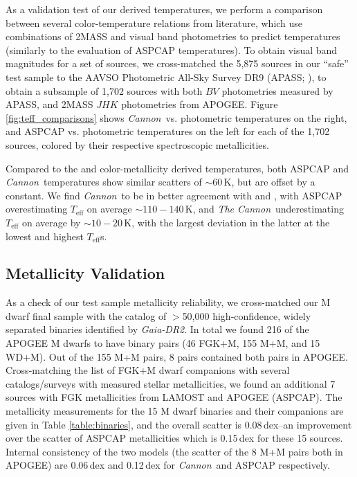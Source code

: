 \documentclass[twocolumn]{aastex62}
\newcommand{\thecannon}{\textsl{The Cannon}}
\newcommand{\cannon}{\textsl{Cannon}}
\newcommand{\drtwo}{\textsl{Gaia-DR2}}
\newcommand{\teff}{T_{\mathrm{eff}}}
\begin{document}
As a validation test of our derived temperatures, we perform a comparison between several color-temperature relations from literature, which use combinations of 2MASS and visual band photometries to predict temperatures (similarly to the \citealt{Schmidt:2016} evaluation of ASPCAP temperatures). To obtain visual band magnitudes for a set of sources, we cross-matched the 5,875 sources in our ``safe'' test sample to the AAVSO Photometric All-Sky Survey DR9 (APASS; \citealt{Henden:2016}), to obtain a subsample of 1,702 sources with both $BV$ photometries measured by APASS, and 2MASS $JHK$ photometries from APOGEE. Figure \ref{fig:teff_comparisons} shows \cannon\ vs. photometric temperatures on the right, and ASPCAP vs. photometric temperatures on the left for each of the 1,702 sources, colored by their respective spectroscopic metallicities.

Compared to the \citet{Mann:2015} and \citet{Boyajian:2012} color-metallicity derived temperatures, both ASPCAP and \cannon\ temperatures show similar scatters of $\sim60\,$K, but are offset by a constant.
We find \cannon\ to be in better agreement with \citet{Mann:2015} and \citet{Boyajian:2012}, with ASPCAP overestimating $\teff$ on average $\sim110-140\,$K, and \thecannon\ underestimating $\teff$ on average by $\sim10-20\,$K, with the largest deviation in the latter at the lowest and highest $\teff$s.

\subsection{Metallicity Validation}

As a check of our test sample metallicity reliability, we cross-matched our M dwarf final sample with the \citet{Elbadry:2018b} catalog of $>$50,000 high-confidence, widely separated binaries identified by \drtwo. 
In total we found 216 of the APOGEE M dwarfs to have binary pairs (46 FGK+M, 155 M+M, and 15 WD+M). Out of the 155 M+M pairs, 8 pairs contained both pairs in APOGEE. Cross-matching the list of FGK+M dwarf companions with several catalogs/surveys with measured stellar metallicities, we found an additional 7 sources with FGK metallicities from LAMOST \citep{Zhao:2012} and APOGEE (ASPCAP). The metallicity measurements for the 15 M dwarf binaries and their companions are given in Table \ref{table:binaries}, and the overall scatter is $0.08\,$dex--an improvement over the scatter of ASPCAP metallicities which is $0.15\,$dex for these 15 sources. Internal consistency of the two models (the scatter of the 8 M+M pairs both in APOGEE) are 0.06\,dex and 0.12\,dex for \cannon\ and ASPCAP respectively.
\end{document}
